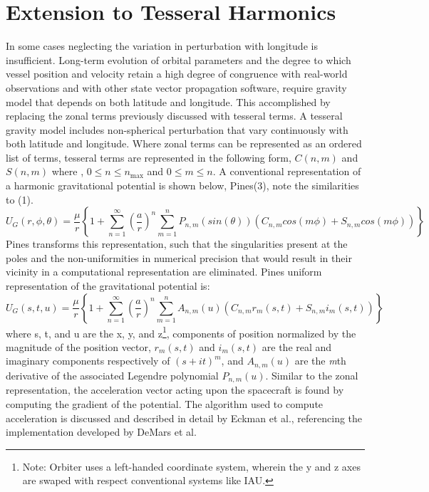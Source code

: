 \documentclass[a4paper]{article}
\begin{document}
\section{Extension to Tesseral Harmonics}
In some cases neglecting the variation in perturbation with longitude is insufficient. Long-term evolution of orbital parameters and the degree to which vessel position and velocity retain a high degree of congruence with real-world observations and with other state vector propagation software, require gravity model that depends on both latitude and longitude.
This accomplished by replacing the zonal terms previously discussed with tesseral terms. A tesseral gravity model includes non-spherical perturbation that vary continuously with both latitude and longitude. Where zonal terms can be represented as an ordered list of terms, tesseral terms are represented in the following form, $C(n,m)$ and $S(n,m)$ where , $0 \leq n \leq n_\text{max}$ and $0 \leq m \leq n$.
A conventional representation of a harmonic gravitational potential is shown below, Pines\cite{pines73}(3), note the similarities to (1).
\begin{equation}
U_G(r,\phi,\theta) = \frac{\mu}{r}\left\{1+\sum_{n=1}^{\infty}\left ( \frac{a}{r} \right )^n \sum_{m=1}^{n}P_{n,m}(sin (\theta))(C_{n,m}cos(m\phi)+S_{n,m}cos(m\phi)) \right\}
\end{equation}
Pines\cite{pines73} transforms this representation, such that the singularities present at the poles and the non-uniformities in numerical precision that would result in their vicinity in a computational representation are eliminated. Pines\cite{pines73} uniform representation of the gravitational potential is:
\begin{equation}
U_G(s, t, u) = \frac{\mu}{r}\left\{1+\sum_{n=1}^{\infty}\left ( \frac{a}{r} \right )^n \sum_{m=1}^{n}A_{n,m}(u)(C_{n,m}r_m(s,t)+S_{n,m}i_m(s,t)) \right\}
\end{equation}
where s, t, and u are the x, y, and z\footnote{Note: Orbiter uses a left-handed coordinate system, wherein the y and z axes are swaped with respect conventional systems like IAU.}, components of position normalized by the magnitude of the position vector, $r_m(s,t)$ and $i_m(s,t)$  are the real and imaginary components respectively of $(s+it)^m$, and $A_{n,m}(u)$ are the \emph{m}th derivative of the associated Legendre polynomial $P_{n,m}(u)$.
Similar to the zonal representation, the acceleration vector acting upon the spacecraft is found by computing the gradient of the potential. The algorithm used to compute acceleration is discussed and described in detail by Eckman et al.\cite{Eckman08}, referencing the implementation developed by DeMars et al.\cite{DeMars08}
\end{document}
